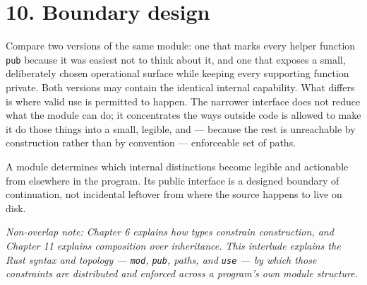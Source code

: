\documentclass[11pt]{book}
\begin{document}
\section*{10. Boundary design}

Compare two versions of the same module: one that marks every helper function \texttt{pub} because it was easiest not to think about it, and one that exposes a small, deliberately chosen operational surface while keeping every supporting function private. Both versions may contain the identical internal capability. What differs is where valid use is permitted to happen. The narrower interface does not reduce what the module can do; it concentrates the ways outside code is allowed to make it do those things into a small, legible, and — because the rest is unreachable by construction rather than by convention — enforceable set of paths.

\begin{invariantbox}
A module determines which internal distinctions become legible and actionable from elsewhere in the program. Its public interface is a designed boundary of continuation, not incidental leftover from where the source happens to live on disk.
\end{invariantbox}

\bigskip
\noindent\textit{Non-overlap note: Chapter 6 explains how types constrain construction, and Chapter 11 explains composition over inheritance. This interlude explains the Rust syntax and topology --- \texttt{mod}, \texttt{pub}, paths, and \texttt{use} --- by which those constraints are distributed and enforced across a program's own module structure.}
\end{document}
